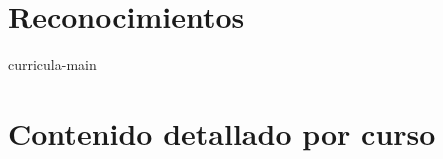 


                             \newpage
                             \newpage
                                 \newpage
       \newpage

\setcounter{page}{1}
\setmyfancyheader
\setmyfancyfoot
\pagestyle{fancy}

\tableofcontents
\listoffigures
\listoftables

\chapter*{Reconocimientos}
                                  \newpage
                          \newpage

% 

\begin{btUnit}
\setcounter{page}{1}

\OnlySPC{}



 
\begin{btSect}{curricula-main}
\section*{\BibliographySection}
\btPrintCited
\end{btSect}
\end{btUnit}

\chapter{Contenido detallado por curso}\label{chap:syllabi}

 
 
% 
% 

